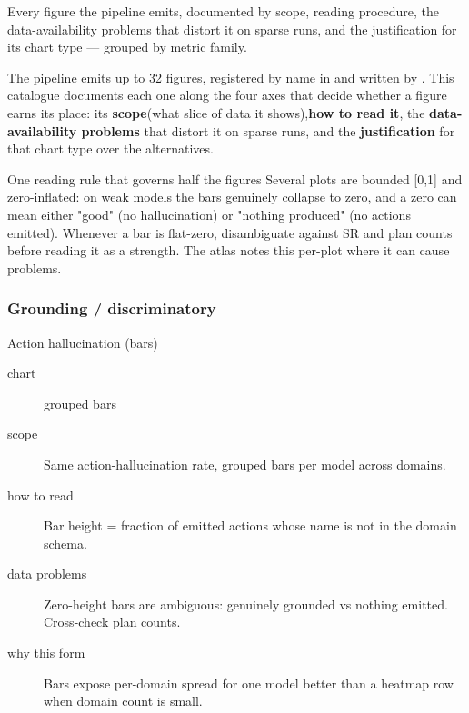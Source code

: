 Every figure the pipeline emits, documented by scope, reading procedure, the data-availability problems that distort it on sparse runs, and the justification for its chart type --- grouped by metric family.

The pipeline emits up to 32 figures, registered by name in  and written by . This catalogue documents each one along the four axes that decide whether a figure earns its place: its \textbf{scope}(what slice of data it shows),\textbf{how to read it}, the \textbf{data-availability problems} that distort it on sparse runs, and the \textbf{justification} for that chart type over the alternatives.

\begin{bmkeybox}{One reading rule that governs half the figures}
Several plots are bounded [0,1] and zero-inflated: on weak models the bars genuinely collapse to zero, and a zero can mean either "good" (no hallucination) or "nothing produced" (no actions emitted). Whenever a bar is flat-zero, disambiguate against SR and plan counts before reading it as a strength. The atlas notes this per-plot where it can cause problems.
\end{bmkeybox}

\subsubsection{Grounding / discriminatory}

\begin{bmplotcard}{Action hallucination (bars)}
\begin{description}
\item[chart] grouped bars
\item[scope] Same action-hallucination rate, grouped bars per model across domains.
\item[how to read] Bar height = fraction of emitted actions whose name is not in the domain schema.
\item[data problems] Zero-height bars are ambiguous: genuinely grounded vs nothing emitted. Cross-check plan counts.
\item[why this form] Bars expose per-domain spread for one model better than a heatmap row when domain count is small.
\end{description}
\end{bmplotcard}

